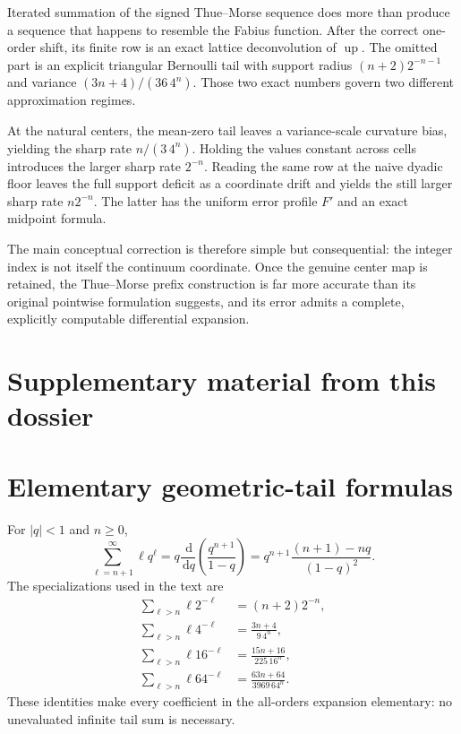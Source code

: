 \documentclass[11pt,oneside]{article}
\theoremstyle{definition}
\theoremstyle{remark}
\newcommand{\Up}{\operatorname{up}}
\newcommand{\dd}{\,\mathrm d}
\begin{document}
Iterated summation of the signed Thue--Morse sequence does more than produce a sequence that
happens to resemble the Fabius function.  After the correct one-order shift, its finite row is
an exact lattice deconvolution of $\Up$.  The omitted part is an explicit triangular Bernoulli
tail with support radius $(n+2)2^{-n-1}$ and variance $(3n+4)/(36\,4^n)$.  Those two exact
numbers govern two different approximation regimes.

At the natural centers, the mean-zero tail leaves a variance-scale curvature bias, yielding
the sharp rate $n/(3\,4^n)$.  Holding the values constant across cells introduces the larger
sharp rate $2^{-n}$.  Reading the same row at the naive dyadic floor leaves the full support
deficit as a coordinate drift and yields the still larger sharp rate $n2^{-n}$.  The latter
has the uniform error profile $F'$ and an exact midpoint formula.

The main conceptual correction is therefore simple but consequential: the integer index is
not itself the continuum coordinate.  Once the genuine center map is retained, the
Thue--Morse prefix construction is far more accurate than its original pointwise formulation
suggests, and its error admits a complete, explicitly computable differential expansion.

\clearpage
\section*{Supplementary material from this dossier}
\section{Elementary geometric-tail formulas}
\label{tmrates:app:tails}

For $|q|<1$ and $n\ge0$,
\begin{equation}
 \sum_{\ell=n+1}^{\infty}\ell q^\ell
 =q\frac{\dd}{\dd q}\left(\frac{q^{n+1}}{1-q}\right)
 =q^{n+1}\frac{(n+1)-nq}{(1-q)^2}.                        \label{tmrates:eq:geometric-tail}
\end{equation}
The specializations used in the text are
\begin{align}
 \sum_{\ell>n}\ell2^{-\ell}&=(n+2)2^{-n},\\
 \sum_{\ell>n}\ell4^{-\ell}&=\frac{3n+4}{9\,4^n},\\
 \sum_{\ell>n}\ell16^{-\ell}&=\frac{15n+16}{225\,16^n},\\
 \sum_{\ell>n}\ell64^{-\ell}&=\frac{63n+64}{3969\,64^n}.
\end{align}
These identities make every coefficient in the all-orders expansion elementary: no
unevaluated infinite tail sum is necessary.
\end{document}
